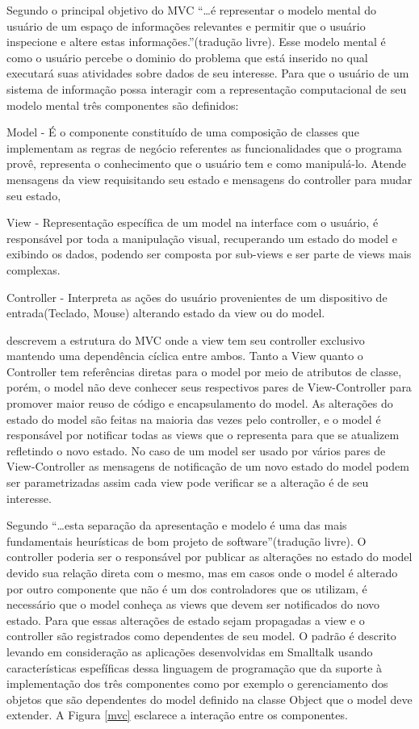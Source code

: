 Segundo  o principal objetivo do MVC
``\ldots é representar o modelo mental do usuário de um espaço de informações
relevantes e permitir que o usuário inspecione e altere estas
informações.''(tradução livre).
Esse modelo mental é como o usuário percebe o dominio do problema que está inserido no qual executará suas atividades sobre dados de seu interesse. Para que o usuário de um sistema de
informação possa interagir com a representação computacional  de seu modelo
mental três componentes são definidos:

Model - É o componente constituído de uma composição de classes que implementam
as regras de negócio referentes as funcionalidades que o programa provê,
representa o  conhecimento que o usuário tem e como manipulá-lo. Atende
mensagens da view requisitando seu estado e mensagens do controller para mudar
seu estado,

View - Representação específica de um model na interface com o usuário, é 
responsável por toda a manipulação visual, recuperando um estado do model e
exibindo os dados, podendo ser composta por sub-views e ser parte de views mais
complexas.

Controller - Interpreta as ações do usuário provenientes de um dispositivo de
entrada(Teclado, Mouse) alterando estado da view ou do model.




 descrevem a estrutura do MVC onde a view tem seu
controller exclusivo mantendo uma dependência cíclica entre ambos. Tanto a View
quanto o Controller tem referências diretas para o model por meio de atributos
de classe, porém, o model não deve conhecer seus respectivos pares de
View-Controller para promover maior reuso de código e encapsulamento do model.
As alterações do estado do model são feitas na maioria das vezes pelo controller, e
o model é responsável por notificar todas as views que o representa para que
se atualizem refletindo o novo estado. No caso de um model ser usado por vários
pares de View-Controller as mensagens de notificação de um novo estado do model
podem ser parametrizadas assim cada view pode verificar se a alteração é de seu
interesse. 

Segundo  ``\ldots esta separação da
apresentação e modelo é uma das mais fundamentais heurísticas de bom projeto
de software''(tradução livre).
O controller poderia ser o responsável por publicar as alterações no estado do
model devido sua relação direta com o mesmo, mas em casos onde o model é
alterado por outro componente que não é um dos controladores que os utilizam, é
necessário que o model conheça as views que devem ser notificados do novo
estado. Para que essas alterações de estado sejam propagadas a view e o
controller são registrados como dependentes de seu model. O padrão é descrito
levando em consideração as aplicações desenvolvidas em Smalltalk usando
características espefíficas dessa linguagem de programação que da suporte à
implementação dos três componentes como por exemplo o gerenciamento dos objetos
que são dependentes do model definido na classe Object que o model deve
extender. A Figura \ref{mvc} esclarece a interação entre os componentes.




